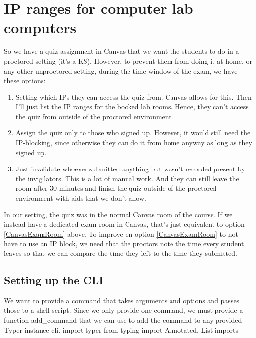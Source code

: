 \chapter{IP ranges for computer lab computers}%

So we have a quiz assignment in Canvas that we want the
students to do in a proctored setting (it's a KS). However, to prevent
them from doing it at home, or any other unproctored setting, during the time 
window of the exam, we have these options:

\begin{enumerate}
  \item Setting which IPs they can access the quiz from. Canvas allows for 
  this. Then I'll just list the IP ranges for the booked lab rooms. Hence, they 
  can't access the quiz from outside of the proctored environment.

  \item\label{CanvasExamRoom} Assign the quiz only to those who signed up. 
  However, it would still need the IP-blocking, since otherwise they can do it 
  from home anyway as long as they signed up.

  \item Just invalidate whoever submitted anything but wasn't recorded present 
  by the invigilators. This is a lot of manual work. And they can still leave 
  the room after 30 minutes and finish the quiz outside of the proctored 
  environment with aids that we don't allow.
\end{enumerate}

In our setting, the quiz was in the normal Canvas room of the course.
If we instead have a dedicated exam room in Canvas, that's just equivalent to 
option \ref{CanvasExamRoom} above.
To improve on option \ref{CanvasExamRoom} to not have to use an IP block, we 
need that the proctors note the time every student leaves so that we can 
compare the time they left to the time they submitted.


\section{Setting up the CLI}

We want to provide a command that takes arguments and options and passes those 
to a shell script.
Since we only provide one command, we must provide a function {\Tt{}add{\_}command\nwendquote} 
that we can use to add the command to any provided {\Tt{}Typer\nwendquote} instance {\Tt{}cli\nwendquote}.
\endmoddef\nwstartdeflinemarkup\nwenddeflinemarkup
import typer
from typing import Annotated, List
\LA{}imports~{\nwtagstyle{}}\RA{}

